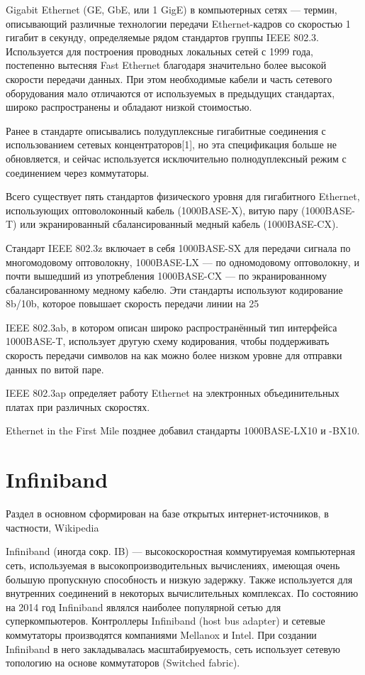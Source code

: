 Gigabit Ethernet (GE, GbE, или 1 GigE) в компьютерных сетях — термин, описывающий различные технологии передачи Ethernet-кадров со скоростью 1 гигабит в секунду, определяемые рядом стандартов группы IEEE 802.3. Используется для построения проводных локальных сетей с 1999 года, постепенно вытесняя Fast Ethernet благодаря значительно более высокой скорости передачи данных. При этом необходимые кабели и часть сетевого оборудования мало отличаются от используемых в предыдущих стандартах, широко распространены и обладают низкой стоимостью.

Ранее в стандарте описывались полудуплексные гигабитные соединения с использованием сетевых концентраторов[1], но эта спецификация больше не обновляется, и сейчас используется исключительно полнодуплексный режим с соединением через коммутаторы. 


Всего существует пять стандартов физического уровня для гигабитного Ethernet, использующих оптоволоконный кабель (1000BASE-X), витую пару (1000BASE-T) или экранированный сбалансированный медный кабель (1000BASE-CX).

Стандарт IEEE 802.3z включает в себя 1000BASE-SX для передачи сигнала по многомодовому оптоволокну, 1000BASE-LX — по одномодовому оптоволокну, и почти вышедший из употребления 1000BASE-CX — по экранированному сбалансированному медному кабелю. Эти стандарты используют кодирование 8b/10b, которое повышает скорость передачи линии на 25 %

IEEE 802.3ab, в котором описан широко распространённый тип интерфейса 1000BASE-T, использует другую схему кодирования, чтобы поддерживать скорость передачи символов на как можно более низком уровне для отправки данных по витой паре.

IEEE 802.3ap определяет работу Ethernet на электронных объединительных платах при различных скоростях.

Ethernet in the First Mile позднее добавил стандарты 1000BASE-LX10 и -BX10. 

\section{Infiniband}
Раздел в основном сформирован на базе открытых интернет-источников, в частности, Wikipedia 

Infiniband (иногда сокр. IB) — высокоскоростная коммутируемая компьютерная сеть, используемая в высокопроизводительных вычислениях, имеющая очень большую пропускную способность и низкую задержку. Также используется для внутренних соединений в некоторых вычислительных комплексах. По состоянию на 2014 год Infiniband являлся наиболее популярной сетью для суперкомпьютеров. Контроллеры Infiniband (host bus adapter) и сетевые коммутаторы производятся компаниями Mellanox и Intel. При создании Infiniband в него закладывалась масштабируемость, сеть использует сетевую топологию на основе коммутаторов (Switched fabric).

